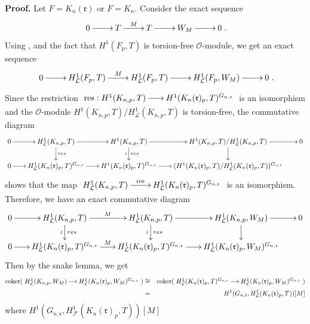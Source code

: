 \documentclass[reqno]{amsart}
\begin{document}
\noindent \textbf{Proof.} Let $F=K_{n}(\mathfrak{r})$ or $F=K_{n}$.
Consider the exact sequence
$$
\xymatrix@=2pc{0\ar[r]&T\ar[r]^-{M}&T\ar[r]&W_{M}\ar[r]&0}.
$$
 Using \cite[Lemma 3.7.1]{MR04}, \cite[Lemma 1.1.5]{MR04} and the
fact that $H^{1} (F_{p},T)$ is torsion-free $\mathcal{O}$-module, we
get an exact sequence
$$
\xymatrix@=2pc{0\ar[r]&H^{1}_{\mathcal{L}}(F_{p},T)\ar[r]^-{M}&H^{1}_{\mathcal{L}}(F_{p},T)\ar[r]&H^{1}_{\mathcal{L}}(F_{p},W_{M})\ar[r]&0}.
$$
Since the restriction $\xymatrix@=1.5pc{\mathrm{res}:
H^{1}(K_{n,p},T)\ar[r]&
H^{1}(K_{n}(\mathfrak{r})_{p},T)^{G_{n,\mathfrak{r}}}}$ is an
isomorphism and the $\mathcal{O}$-module
$H^{1}(K_{n,p},T)/H^{1}_{\mathcal{L}}(K_{n,p},T)$ is torsion-free,
the commutative diagram
$$
\xymatrix@=1.5 pc{ 0\ar[r]&
H^{1}_{\mathcal{L}}(K_{n,p},T)\ar[r]\ar[d]^-{res}&
H^{1}(K_{n,p},T)\ar[r]\ar[d]^-{res}_-{\wr}&
H^{1}(K_{n,p},T)/H^{1}_{\mathcal{L}}(K_{n,p},T)\ar[r]\ar[d]& 0\\
0\ar[r]&
H^{1}_{\mathcal{L}}(K_{n}(\mathfrak{r})_{p},T)^{G_{n,\mathfrak{r}}}\ar[r]&
H^{1}(K_{n}(\mathfrak{r})_{p},T)^{G_{n,\mathfrak{r}}}\ar[r]&
(H^{1}(K_{n}(\mathfrak{r})_{p},T)/H^{1}_{\mathcal{L}}(K_{n}(\mathfrak{r})_{p},T))^{G_{n,\mathfrak{r}}}&
}
$$
shows that the map  $\xymatrix@=2pc{
H^{1}_{\mathcal{L}}(K_{n,p},T)\ar[r]^-{\mathrm{res}}&
H^{1}_{\mathcal{L}}(K_{n}(\mathfrak{r})_{p},T)^{G_{n,\mathfrak{r}}}}$
is an isomorphism. Therefore, we have an exact commutative diagram
$$
\xymatrix@=1.5pc{0\ar[r]&H^{1}_{\mathcal{L}}(K_{n,p},T)\ar[r]^-{M}\ar[d]^-{res}_-{\wr}&
H^{1}_{\mathcal{L}}(K_{n,p},T)\ar[r]\ar[d]^-{res}_-{\wr}&
H^{1}_{\mathcal{L}}(K_{n,p},W_{M})\ar[d]\ar[r]&0\\
0\ar[r]&H^{1}_{\mathcal{L}}(K_{n}(\mathfrak{r})_{p},T)^{G_{n,\mathfrak{r}}}\ar[r]^-{M}&
H^{1}_{\mathcal{L}}(K_{n}(\mathfrak{r})_{p},T)^{G_{n,\mathfrak{r}}}\ar[r]&
H^{1}_{\mathcal{L}}(K_{n}(\mathfrak{r})_{p},W_{M})^{G_{n,\mathfrak{r}}}&
}
$$
Then by the snake lemma, we get
\begin{eqnarray*}
  \mathrm{coker}(\xymatrix@=1pc{ H^{1}_{\mathcal{L}}(K_{n,p},W_{M})\ar[r]&
   H^{1}_{\mathcal{L}}(K_{n}(\mathfrak{r})_{p},W_{M})^{G_{n,\mathfrak{r}}}}) &\cong&
   \mathrm{coker}(\xymatrix@=1pc{ H^{1}_{\mathcal{L}}(K_{n}(\mathfrak{r})_{p},T)^{G_{n,\mathfrak{r}}}
   \ar[r]& H^{1}_{\mathcal{L}}(K_{n}(\mathfrak{r})_{p},W_{M})^{G_{n,\mathfrak{r}}}})\\
   &=& H^{1}(G_{n,\mathfrak{r}},H^{1}_{\mathcal{L}}(K_{n}(\mathfrak{r})_{p},T))[M]
\end{eqnarray*}
where
$H^{1}(G_{n,\mathfrak{r}},H^{1}_{\mathcal{F}}(K_{n}(\mathfrak{r})_{p},T))[M]$
\end{document}
